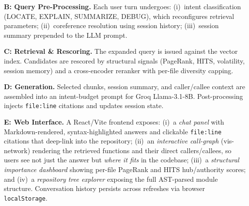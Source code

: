 \documentclass[conference]{IEEEtran}
\begin{document}
\textbf{B: Query Pre-Processing.} Each user turn undergoes:
(i)~intent classification (LOCATE, EXPLAIN, SUMMARIZE, DEBUG), which
reconfigures retrieval parameters; (ii)~coreference resolution using
session history; (iii)~session summary prepended to the LLM prompt.

\textbf{C: Retrieval \& Rescoring.} The expanded query is issued
against the vector index. Candidates are rescored by structural signals
(PageRank, HITS, volatility, session memory) and a cross-encoder
reranker with per-file diversity capping.

\textbf{D: Generation.} Selected chunks, session summary, and
caller/callee context are assembled into an intent-budget prompt for
Groq Llama-3.1-8B. Post-processing injects \texttt{file:line} citations
and updates session state.

\textbf{E: Web Interface.} A React/Vite frontend exposes: (i)~a
\emph{chat panel} with Markdown-rendered, syntax-highlighted answers and
clickable \texttt{file:line} citations that deep-link into the repository;
(ii)~an \emph{interactive call-graph} (vis-network) rendering the
retrieved functions and their direct callers/callees, so users see not just
the answer but \emph{where it fits} in the codebase; (iii)~a
\emph{structural importance dashboard} showing per-file PageRank and HITS
hub/authority scores; and (iv)~a \emph{repository tree explorer} exposing
the full AST-parsed module structure. Conversation history persists across
refreshes via browser \texttt{localStorage}.
\end{document}
